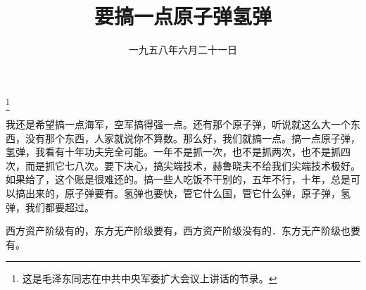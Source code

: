 
\title{要搞一点原子弹氢弹}
\date{一九五八年六月二十一日}
\thanks{这是毛泽东同志在中共中央军委扩大会议上讲话的节录。}
\maketitle


我还是希望搞一点海军，空军搞得强一点。还有那个原子弹，听说就这么大一个东西，没有那个东西，人家就说你不算数。那么好，我们就搞一点。搞一点原子弹，氢弹，我看有十年功夫完全可能。一年不是抓一次，也不是抓两次，也不是抓四次，而是抓它七八次。要下决心，搞尖端技术，赫鲁晓夫不给我们尖端技术极好。如果给了，这个账是很难还的。搞一些人吃饭不干别的，五年不行，十年，总是可以搞出来的，原子弹要有。氢弹也要快，管它什么国，管它什么弹，原子弹，氢弹，我们都要超过。

西方资产阶级有的，东方无产阶级要有，西方资产阶级没有的．东方无产阶级也要有。
